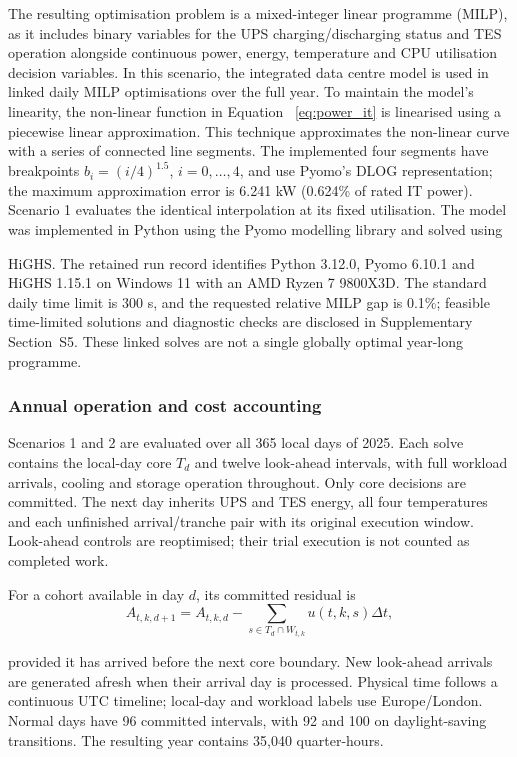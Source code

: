 \documentclass[lettersize,journal]{IEEEtran}
\providecommand{\DIFadd}[1]{{\color{blue}#1}}
\providecommand{\DIFaddbegin}{}
\providecommand{\DIFaddend}{}
\begin{document}
\DIFaddbegin \DIFadd{The resulting optimisation problem is a mixed-integer linear programme (MILP), as it includes binary variables for the UPS charging/discharging status and TES operation alongside continuous power, energy, temperature and CPU utilisation decision variables. }\DIFaddend In this scenario, the integrated  \DIFaddbegin \DIFadd{data centre }\DIFaddend model is used in  \DIFaddbegin \DIFadd{linked daily MILP optimisations over the full year}\DIFaddend . To maintain the model's linearity, the non-linear function in Equation~ \DIFaddbegin \DIFadd{\eqref{eq:power_it} is linearised }\DIFaddend using a piecewise linear approximation. This technique approximates the non-linear curve with a series of connected line segments. The \DIFaddbegin \DIFadd{implemented four segments have breakpoints $b_i=(i/4)^{1.5}$, $i=0,\ldots,4$, and use Pyomo's DLOG representation; the maximum approximation error is 6.241 kW (0.624\% of rated IT power). Scenario 1 evaluates the identical interpolation at its fixed utilisation. The }\DIFaddend model was implemented in Python using the Pyomo modelling library and solved using  \DIFaddbegin \DIFadd{HiGHS. The retained run record identifies Python 3.12.0, Pyomo 6.10.1 and HiGHS 1.15.1 on Windows 11 with an AMD Ryzen 7 9800X3D. The standard daily time limit is 300 s, and the requested relative MILP gap is 0.1\%; feasible time-limited solutions and diagnostic checks are disclosed in Supplementary Section~S5. These linked solves are not a single globally optimal year-long programme.

}\DIFaddend 



\DIFaddbegin \subsubsection{\DIFadd{Annual operation and cost accounting}}\label{sec:annual-operation}
\DIFadd{Scenarios 1 and 2 are evaluated over all 365 local days of 2025. Each solve contains the local-day core $T_d$ and twelve look-ahead intervals, with full workload arrivals, cooling and storage operation throughout. Only core decisions are committed. The next day inherits UPS and TES energy, all four temperatures and each unfinished arrival/tranche pair with its original execution window. Look-ahead controls are reoptimised; their trial execution is not counted as completed work.

}

\DIFadd{For a cohort available in day $d$, its committed residual is
}\begingroup\color{blue}
\begin{equation}
A_{t,k,d+1}=A_{t,k,d}-\sum_{s\in T_d\cap W_{t,k}}u(t,k,s)\Delta t,
\label{eq:cohort-handoff}
\end{equation}
\endgroup
\DIFadd{provided it has arrived before the next core boundary. New look-ahead arrivals are generated afresh when their arrival day is processed. Physical time follows a continuous UTC timeline; local-day and workload labels use Europe/London. Normal days have 96 committed intervals, with 92 and 100 on daylight-saving transitions. The resulting year contains 35,040 quarter-hours.

}
\end{document}
